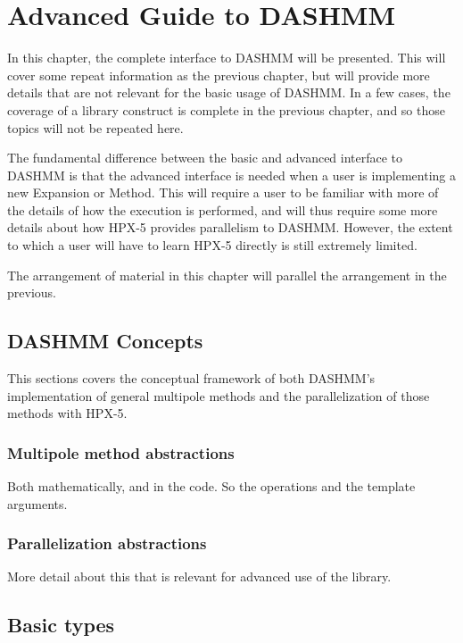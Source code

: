 \chapter{Advanced Guide to DASHMM}
\label{ch:advanced}

In this chapter, the complete interface to DASHMM will be presented. This will
cover some repeat information as the previous chapter, but will provide more
details that are not relevant for the basic usage of DASHMM. In a few cases,
the coverage of a library construct is complete in the previous chapter, and
so those topics will not be repeated here.

The fundamental difference between the basic and advanced interface to
DASHMM is that the advanced interface is needed when a user is implementing
a new Expansion or Method. This will require a user to be familiar with more
of the details of how the execution is performed, and will thus require some
more details about how HPX-5 provides parallelism to DASHMM. However, the
extent to which a user will have to learn HPX-5 directly is still extremely
limited.

The arrangement of material in this chapter will parallel the arrangement in
the previous.

\section{DASHMM Concepts}
\label{sec:advconcepts}

This sections covers the conceptual framework of both DASHMM's implementation
of general multipole methods and the parallelization of those methods with
HPX-5.

\subsection{Multipole method abstractions}

Both mathematically, and in the code. So the operations and the template
arguments.

\subsection{Parallelization abstractions}

More detail about this that is relevant for advanced use of the library.



\section{Basic types}

